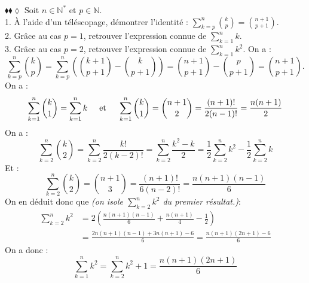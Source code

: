\documentclass[11pt]{article}
\begin{document}
\pagebreak


\begin{exercice}{$\blacklozenge\blacklozenge\lozenge$}{}
    Soit $n\in\mathbb{N}^*$ et $p\in\mathbb{N}$.\\
    1. À l'aide d'un téléscopage, démontrer l'identité : $\sum\limits^{n}_{k=p}{\binom{k}{p}}=\binom{n+1}{p+1}$.\\
    2. Grâce au cas $p=1$, retrouver l'expression connue de $\sum\limits_{k=1}^nk$.\\
    3. Grâce au cas $p=2$, retrouver l'expression connue de $\sum_{k=1}^nk^2$.
    \tcblower
     On a :
    \begin{equation*}
        \sum\limits^{n}_{k=p}\binom{k}{p}=\sum\limits^{n}_{k=p}{\left(\binom{k+1}{p+1}-\binom{k}{p+1}\right)}=\binom{n+1}{p+1}-\binom{p}{p+1}=\binom{n+1}{p+1}.
    \end{equation*}
     On a :
    \begin{equation*}
        \sum\limits^{n}_{k=1}{\binom{k}{1}}=\sum\limits^{n}_{k=1}{k} \hspace{0.5cm} \mathrm{et} \hspace{0.5cm} \sum\limits^{n}_{k=1}{\binom{k}{1}}=\binom{n+1}{2}=\frac{(n+1)!}{2(n-1)!}=\frac{n(n+1)}{2}
    \end{equation*}
     On a :
    \begin{equation*}
        \sum\limits^{n}_{k=2}{\binom{k}{2}}=\sum\limits^{n}_{k=2}{\frac{k!}{2(k-2)!}}=\sum\limits^{n}_{k=2}{\frac{k^2-k}{2}}=\frac{1}{2}\sum\limits^{n}_{k=2}{k^2}-\frac{1}{2}\sum\limits^{n}_{k=2}{k}
    \end{equation*}
    Et :
    \begin{equation*}
        \sum\limits^{n}_{k=2}{\binom{k}{2}}=\binom{n+1}{3}=\frac{(n+1)!}{6(n-2)!}=\frac{n(n+1)(n-1)}{6}
    \end{equation*}
    On en déduit donc que \emph{(on isole $\sum\limits^{n}_{k=2}{k^2}$ du premier résultat.)}:
    \begin{align*}
        \sum\limits^{n}_{k=2}{k^2}&=2\left(\frac{n(n+1)(n-1)}{6}+\frac{n(n+1)}{4}-\frac{1}{2}\right)\\
        &=\frac{2n(n+1)(n-1)+3n(n+1)-6}{6}
        =\frac{n(n+1)(2n+1)-6}{6}
    \end{align*}
    On a donc :
    \begin{equation*}
        \sum\limits^{n}_{k=1}{k^2}=\sum\limits^{n}_{k=2}{k^2}+1=\frac{n(n+1)(2n+1)}{6}
    \end{equation*}
\end{exercice}
\end{document}
